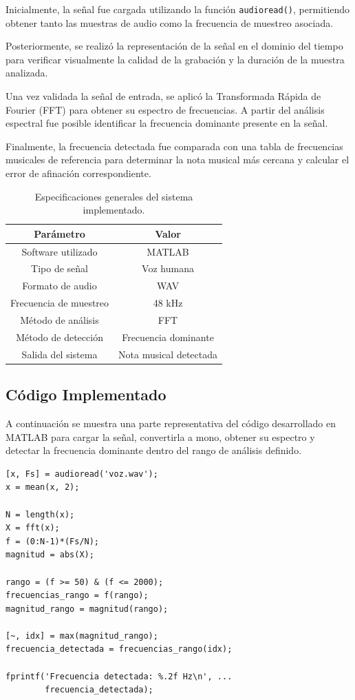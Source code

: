 \documentclass[12pt]{article}
\begin{document}
Inicialmente, la señal fue cargada utilizando la función \texttt{audioread()}, permitiendo obtener tanto las muestras de audio como la frecuencia de muestreo asociada.

Posteriormente, se realizó la representación de la señal en el dominio del tiempo para verificar visualmente la calidad de la grabación y la duración de la muestra analizada.

Una vez validada la señal de entrada, se aplicó la Transformada Rápida de Fourier (FFT) para obtener su espectro de frecuencias. A partir del análisis espectral fue posible identificar la frecuencia dominante presente en la señal.

Finalmente, la frecuencia detectada fue comparada con una tabla de frecuencias musicales de referencia para determinar la nota musical más cercana y calcular el error de afinación correspondiente.





\begin{table}[htbp]
\centering
\begin{tabular}{|c|c|}
\hline
Parámetro & Valor \\
\hline
Software utilizado & MATLAB \\
Tipo de señal & Voz humana \\
Formato de audio & WAV \\
Frecuencia de muestreo & 48 kHz \\
Método de análisis & FFT \\
Método de detección & Frecuencia dominante \\
Salida del sistema & Nota musical detectada \\
\hline
\end{tabular}
\caption{Especificaciones generales del sistema implementado.}
\label{tab:especificaciones}
\end{table}



\subsection{Código Implementado}

A continuación se muestra una parte representativa del código desarrollado en MATLAB para cargar la señal, convertirla a mono, obtener su espectro y detectar la frecuencia dominante dentro del rango de análisis definido.

\begin{verbatim}
[x, Fs] = audioread('voz.wav');
x = mean(x, 2);

N = length(x);
X = fft(x);
f = (0:N-1)*(Fs/N);
magnitud = abs(X);

rango = (f >= 50) & (f <= 2000);
frecuencias_rango = f(rango);
magnitud_rango = magnitud(rango);

[~, idx] = max(magnitud_rango);
frecuencia_detectada = frecuencias_rango(idx);

fprintf('Frecuencia detectada: %.2f Hz\n', ...
        frecuencia_detectada);
\end{verbatim}
\end{document}
